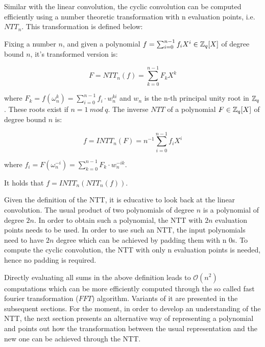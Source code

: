 Similar with the linear convolution, the cyclic convolution can be computed efficiently using a number theoretic transformation with n evaluation points, i.e. $NTT_n$. This transformation is defined below:

\begin{definition}
    Fixing a number $n$, and given a polynomial $f = \sum_{i=0}^{n-1} f_i X^i \in \mathbb{Z}_q[X]$ of degree bound $n$, it's transformed version is:
    
    \begin{equation*}
        F = NTT_n(f) = \sum_{k=0}^{n-1} F_k X^k
    \end{equation*}
    
    where $F_k = f(\omega_n^k) = \sum_{i=0}^{n-1} f_i \cdot w_n^{ki}$ and $w_n$ is the n-th principal unity root in $\mathbb{Z}_q$. These roots exist if $n = 1\ mod\ q$. The inverse $NTT$ of a polynomial $F \in \mathbb{Z}_q[X]$ of degree bound $n$ is:
    
    \begin{equation*}
        f = INTT_n(F) = n^{-1} \sum_{i=0}^{n-1} f_i X^i
    \end{equation*}

    where $f_i = F(\omega_n^{-i}) = \sum_{k=0}^{n-1} F_k \cdot w_n^{-ik}$.
\end{definition}

\begin{theorem}
    It holds that $f = INTT_n(NTT_n(f))$.
\end{theorem}

Given the definition of the NTT, it is educative to look back at the linear convolution. The usual product of two polynomials of degree $n$ is a polynomial of degree $2n$. In order to obtain such a polynomial, the NTT with $2n$ evaluation points needs to be used. In order to use such an NTT, the input polynomials need to have $2n$ degree which can be achieved by padding them with n 0s. To compute the cyclic convolution, the NTT with only n evaluation points is needed, hence no padding is required.

Directly evaluating all sums in the above definition leads to $\mathcal{O}(n^2)$ computations which can be more efficiently computed through the so called fast fourier transformation ($FFT$) algorithm. Variants of it are presented in the subsequent sections. For the moment, in order to develop an understanding of the NTT, the next section presents an alternative way of representing a polynomial and points out how the transformation between the usual representation and the new one can be achieved through the NTT.


